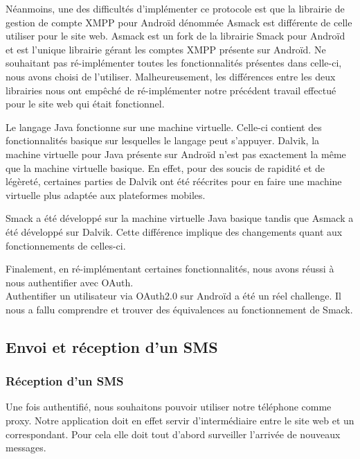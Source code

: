 Néanmoins, une des difficultés d'implémenter ce protocole est que la librairie de gestion de compte
XMPP pour Androïd dénommée Asmack est différente de celle utiliser pour le site web. Asmack est un fork 
de la librairie Smack pour Androïd et est l'unique librairie gérant les comptes XMPP présente sur
Androïd. Ne souhaitant pas ré-implémenter toutes les fonctionnalités présentes dans celle-ci, nous avons
choisi de l'utiliser. Malheureusement, les différences entre les deux librairies nous ont empêché de 
ré-implémenter notre précédent travail effectué pour le site web qui était fonctionnel. 
 
Le langage Java fonctionne sur une machine virtuelle. Celle-ci contient des fonctionnalités basique sur
lesquelles le langage peut s'appuyer. Dalvik, la machine virtuelle pour Java présente sur Androïd n'est 
pas exactement la même que la machine virtuelle basique. En effet, pour des soucis de rapidité et de 
légèreté, certaines parties de Dalvik ont été réécrites pour en faire une machine virtuelle plus adaptée
aux plateformes mobiles.
 
Smack a été développé sur la machine virtuelle Java basique tandis que Asmack a été développé sur Dalvik.
Cette différence implique des changements quant aux fonctionnements de celles-ci. 
 
Finalement, en ré-implémentant certaines fonctionnalités, nous avons réussi à nous authentifier avec OAuth.
\\
 
 
Authentifier un utilisateur via OAuth2.0 sur Androïd a été un réel challenge. Il nous a fallu comprendre 
et trouver des équivalences au fonctionnement de Smack. 
\\
 
 
 
\subsection{Envoi et réception d'un SMS}
 
\subsubsection{Réception d'un SMS}
 
Une fois authentifié, nous souhaitons pouvoir utiliser notre téléphone comme proxy. Notre application
doit en effet servir d'intermédiaire entre le site web et un correspondant. Pour cela elle doit tout
d'abord surveiller l'arrivée de nouveaux messages. 
 
